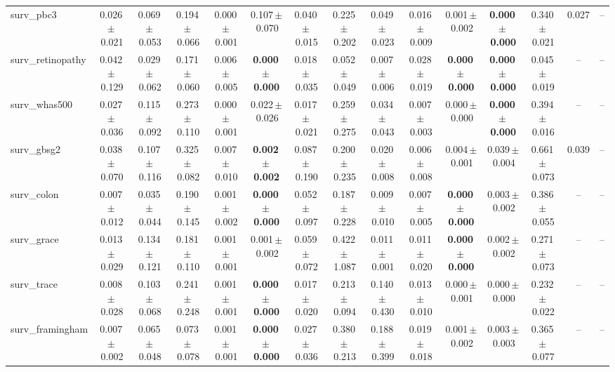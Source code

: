 \documentclass[8pt]{extarticle}
\begin{document}
\begin{longtable}{l*{14}{c}}
surv\_pbc3 & 0.026\,$\pm$\,0.021 & 0.069\,$\pm$\,0.053 & 0.194\,$\pm$\,0.066 & 0.000\,$\pm$\,0.001 & 0.107\,$\pm$\,0.070 & 0.040\,$\pm$\,0.015 & 0.225\,$\pm$\,0.202 & 0.049\,$\pm$\,0.023 & 0.016\,$\pm$\,0.009 & 0.001\,$\pm$\,0.002 & \textbf{0.000\,$\pm$\,0.000} & 0.340\,$\pm$\,0.021 & 0.027 & -- \\
surv\_retinopathy & 0.042\,$\pm$\,0.129 & 0.029\,$\pm$\,0.062 & 0.171\,$\pm$\,0.060 & 0.006\,$\pm$\,0.005 & \textbf{0.000\,$\pm$\,0.000} & 0.018\,$\pm$\,0.035 & 0.052\,$\pm$\,0.049 & 0.007\,$\pm$\,0.006 & 0.028\,$\pm$\,0.019 & \textbf{0.000\,$\pm$\,0.000} & \textbf{0.000\,$\pm$\,0.000} & 0.045\,$\pm$\,0.019 & -- & -- \\
surv\_whas500 & 0.027\,$\pm$\,0.036 & 0.115\,$\pm$\,0.092 & 0.273\,$\pm$\,0.110 & 0.000\,$\pm$\,0.001 & 0.022\,$\pm$\,0.026 & 0.017\,$\pm$\,0.021 & 0.259\,$\pm$\,0.275 & 0.034\,$\pm$\,0.043 & 0.007\,$\pm$\,0.003 & 0.000\,$\pm$\,0.000 & \textbf{0.000\,$\pm$\,0.000} & 0.394\,$\pm$\,0.016 & -- & -- \\
surv\_gbsg2 & 0.038\,$\pm$\,0.070 & 0.107\,$\pm$\,0.116 & 0.325\,$\pm$\,0.082 & 0.007\,$\pm$\,0.010 & \textbf{0.002\,$\pm$\,0.002} & 0.087\,$\pm$\,0.190 & 0.200\,$\pm$\,0.235 & 0.020\,$\pm$\,0.008 & 0.006\,$\pm$\,0.008 & 0.004\,$\pm$\,0.001 & 0.039\,$\pm$\,0.004 & 0.661\,$\pm$\,0.073 & 0.039 & -- \\
surv\_colon & 0.007\,$\pm$\,0.012 & 0.035\,$\pm$\,0.044 & 0.190\,$\pm$\,0.145 & 0.001\,$\pm$\,0.002 & \textbf{0.000\,$\pm$\,0.000} & 0.052\,$\pm$\,0.097 & 0.187\,$\pm$\,0.228 & 0.009\,$\pm$\,0.010 & 0.007\,$\pm$\,0.005 & \textbf{0.000\,$\pm$\,0.000} & 0.003\,$\pm$\,0.002 & 0.386\,$\pm$\,0.055 & -- & -- \\
surv\_grace & 0.013\,$\pm$\,0.029 & 0.134\,$\pm$\,0.121 & 0.181\,$\pm$\,0.110 & 0.001\,$\pm$\,0.001 & 0.001\,$\pm$\,0.002 & 0.059\,$\pm$\,0.072 & 0.422\,$\pm$\,1.087 & 0.011\,$\pm$\,0.001 & 0.011\,$\pm$\,0.020 & \textbf{0.000\,$\pm$\,0.000} & 0.002\,$\pm$\,0.002 & 0.271\,$\pm$\,0.073 & -- & -- \\
surv\_trace & 0.008\,$\pm$\,0.028 & 0.103\,$\pm$\,0.068 & 0.241\,$\pm$\,0.248 & 0.001\,$\pm$\,0.001 & \textbf{0.000\,$\pm$\,0.000} & 0.017\,$\pm$\,0.020 & 0.213\,$\pm$\,0.094 & 0.140\,$\pm$\,0.430 & 0.013\,$\pm$\,0.010 & 0.000\,$\pm$\,0.001 & 0.000\,$\pm$\,0.000 & 0.232\,$\pm$\,0.022 & -- & -- \\
surv\_framingham & 0.007\,$\pm$\,0.002 & 0.065\,$\pm$\,0.048 & 0.073\,$\pm$\,0.078 & 0.001\,$\pm$\,0.001 & \textbf{0.000\,$\pm$\,0.000} & 0.027\,$\pm$\,0.036 & 0.380\,$\pm$\,0.213 & 0.188\,$\pm$\,0.399 & 0.019\,$\pm$\,0.018 & 0.001\,$\pm$\,0.002 & 0.003\,$\pm$\,0.003 & 0.365\,$\pm$\,0.077 & -- & -- \\

\end{longtable}
\end{document}
